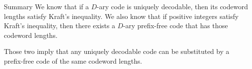 \documentclass[a4paper]{article}
\begin{document}
\begin{parag}{Summary}
    We know that if a $D$-ary code is uniquely decodable, then its codeword lengths satisfy Kraft's inequality. We also know that if positive integers satisfy Kraft's inequality, then there exists a $D$-ary prefix-free code that has those codeword lengths.

    Those two imply that any uniquely decodable code can be substituted by a prefix-free code of the same codeword lengths.
\end{parag}
\end{document}
